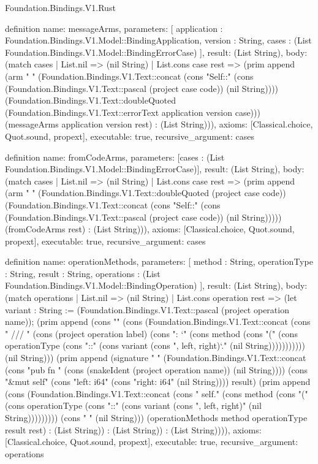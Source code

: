 \begin{lexlean}{Foundation.Bindings.V1.Rust}
\begin{semanticmodule}
{{definition{
  name: messageArms,
  parameters: [
    application : Foundation.Bindings.V1.Model::BindingApplication,
    version : String,
    cases : (List Foundation.Bindings.V1.Model::BindingErrorCase)
  ],
  result: (List String),
  body: (match cases
    | List.nil => (nil String)
    | List.cons case rest => (prim append (arm "            " (Foundation.Bindings.V1.Text::concat (cons "Self::" (cons (Foundation.Bindings.V1.Text::pascal (project case code)) (nil String)))) (Foundation.Bindings.V1.Text::doubleQuoted (Foundation.Bindings.V1.Text::errorText application version case))) (messageArms application version rest) : (List String))),
  axioms: [Classical.choice, Quot.sound, propext],
  executable: true,
  recursive_argument: cases
}

definition{
  name: fromCodeArms,
  parameters: [cases : (List Foundation.Bindings.V1.Model::BindingErrorCase)],
  result: (List String),
  body: (match cases
    | List.nil => (nil String)
    | List.cons case rest => (prim append (arm "            " (Foundation.Bindings.V1.Text::doubleQuoted (project case code)) (Foundation.Bindings.V1.Text::concat (cons "Self::" (cons (Foundation.Bindings.V1.Text::pascal (project case code)) (nil String))))) (fromCodeArms rest) : (List String))),
  axioms: [Classical.choice, Quot.sound, propext],
  executable: true,
  recursive_argument: cases
}

definition{
  name: operationMethods,
  parameters: [
    method : String,
    operationType : String,
    result : String,
    operations : (List Foundation.Bindings.V1.Model::BindingOperation)
  ],
  result: (List String),
  body: (match operations
    | List.nil => (nil String)
    | List.cons operation rest => (let variant : String := (Foundation.Bindings.V1.Text::pascal (project operation name)); (prim append (cons "" (cons (Foundation.Bindings.V1.Text::concat (cons "    /// " (cons (project operation label) (cons ": `" (cons method (cons "(" (cons operationType (cons "::" (cons variant (cons ", left, right)`." (nil String))))))))))) (nil String))) (prim append (signature "    " (Foundation.Bindings.V1.Text::concat (cons "pub fn " (cons (snakeIdent (project operation name)) (nil String)))) (cons "&mut self" (cons "left: i64" (cons "right: i64" (nil String)))) result) (prim append (cons (Foundation.Bindings.V1.Text::concat (cons "        self." (cons method (cons "(" (cons operationType (cons "::" (cons variant (cons ", left, right)" (nil String))))))))) (cons "    }" (nil String))) (operationMethods method operationType result rest) : (List String)) : (List String)) : (List String)))),
  axioms: [Classical.choice, Quot.sound, propext],
  executable: true,
  recursive_argument: operations
}

}
\end{semanticmodule}
\end{lexlean}
